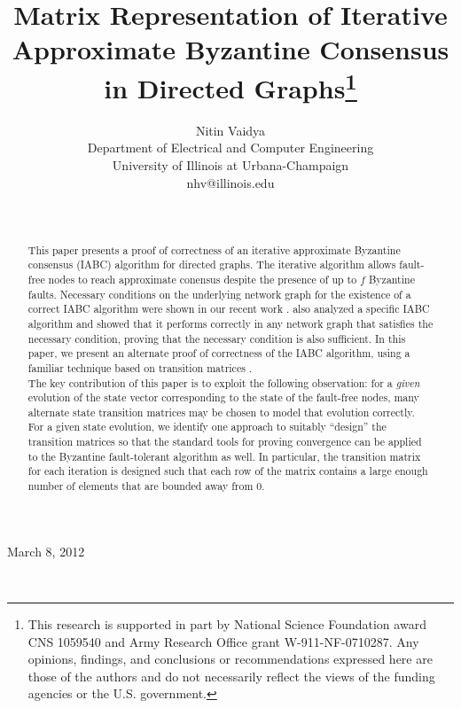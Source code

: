 \documentclass[letterpaper, 12pt]{article}
\title{Matrix Representation of Iterative Approximate Byzantine Consensus in Directed Graphs\thanks{This research is supported
in part by
 National
Science Foundation award CNS 1059540 and Army Research Office grant W-911-NF-0710287. Any opinions, findings, and conclusions or recommendations expressed here are those of the authors and do not
necessarily reflect the views of the funding agencies or the U.S. government.}
}
\author{Nitin Vaidya\\ Department of Electrical and Computer Engineering\\ University of Illinois at Urbana-Champaign\\ nhv@illinois.edu}
\begin{document}
\date{~}

\maketitle

\centerline{March 8, 2012}

~

\begin{abstract}
This paper presents a proof of correctness of an iterative
approximate Byzantine
consensus (IABC) algorithm for directed graphs. The iterative algorithm allows
fault-free nodes to reach approximate conensus despite the presence of up
to $f$ Byzantine faults. Necessary conditions on the underlying network
graph for the existence of a correct IABC algorithm were shown in our
recent work \cite{IBA_sync,us}. \cite{IBA_sync} also analyzed
a specific IABC algorithm and showed that it performs correctly in any
network graph that satisfies the necessary condition, proving that the
necessary condition is also sufficient. In this paper, we present an 
alternate proof of correctness of the IABC algorithm, using a familiar
technique based on transition matrices \cite{jadbabaie_consensus,Benezit,vaidyaII,Zhang}.\\

The key contribution of this paper is to exploit the
following observation: for a {\em given} evolution of the state vector
corresponding to the state of the fault-free nodes, 
many alternate state transition matrices may be chosen to model
that evolution correctly. For a given state evolution, we identify one approach
to suitably ``design'' the transition matrices so that the standard tools
for proving convergence can be applied to the Byzantine fault-tolerant
algorithm as well.
In particular, the transition matrix for each iteration
is designed such that each row of the matrix contains a large enough number
of elements that are bounded away from 0. \\


\end{abstract}







\newcommand{\deltaC}{\delta_{N_i^*[t]}}
\newcommand{\bfA}{{\bf A}}
\newcommand{\bfB}{{\bf B}}
\newcommand{\bfC}{{\bf C}}
\newcommand{\bfG}{{\bf G}}
\newcommand{\bfH}{{\bf H}}
\newcommand{\bfK}{{\bf K}}
\newcommand{\bfM}{{\bf M}}
\newcommand{\bfP}{{\bf P}}
\newcommand{\bfQ}{{\bf Q}}
\newcommand{\bfv}{{\bf v}}
\newcommand{\sH}{\mathcal{H}}
\newcommand{\T}[1]{\overline{#1}}
\end{document}
